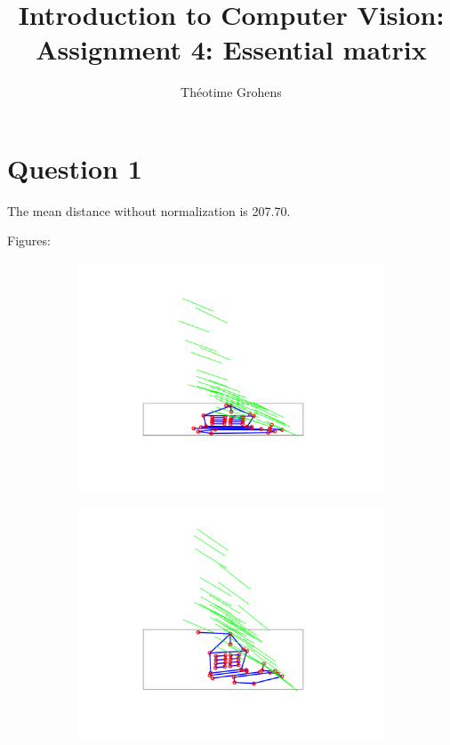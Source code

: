 \documentclass[a4paper]{article}
\author{Théotime Grohens}
\title{Introduction to Computer Vision: \\ Assignment 4: Essential matrix}
\begin{document}
\maketitle

\section*{Question 1}

The mean distance without normalization is 207.70.

Figures:

\begin{figure}[h]
\begin{subfigure}{0.5\textwidth}
\includegraphics[width=\textwidth]{epi1.png}
\end{subfigure}
\begin{subfigure}{0.5\textwidth}
\includegraphics[width=\textwidth]{epi2.png}
\end{subfigure}
\end{figure}
\end{document}
